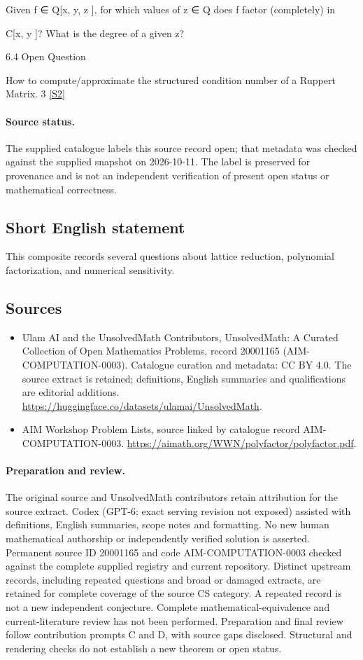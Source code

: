 \documentclass[11pt]{article}
\begin{document}
Given f ∈ Q[x, y, z ], for which values of z ∈ Q does f factor (completely) in

C[x, y ]? What is the degree of a given z?

6.4 Open Question

How to compute/approximate the structured condition number of a Ruppert Matrix. 3 \href{https://aimath.org/WWN/polyfactor/polyfactor.pdf}{[S2]}
\paragraph{Source status.}
The supplied catalogue labels this source record open; that metadata was checked against the supplied snapshot on 2026-10-11. The label is preserved for provenance and is not an independent verification of present open status or mathematical correctness.
\subsection{Short English statement}
This composite records several questions about lattice reduction, polynomial factorization, and numerical sensitivity.
\subsection{Sources}
\begin{itemize}
\item[S1] Ulam AI and the UnsolvedMath Contributors, UnsolvedMath: A Curated Collection of Open Mathematics Problems, record 20001165 (AIM-COMPUTATION-0003). Catalogue curation and metadata: CC BY 4.0. The source extract is retained; definitions, English summaries and qualifications are editorial additions.
\url{https://huggingface.co/datasets/ulamai/UnsolvedMath}.
\item[S2] AIM Workshop Problem Lists, source linked by catalogue record AIM-COMPUTATION-0003.
\url{https://aimath.org/WWN/polyfactor/polyfactor.pdf}.
\end{itemize}
\paragraph{Preparation and review.}
The original source and UnsolvedMath contributors retain attribution for the source extract. Codex (GPT-6; exact serving revision not exposed) assisted with definitions, English summaries, scope notes and formatting. No new human mathematical authorship or independently verified solution is asserted. Permanent source ID 20001165 and code AIM-COMPUTATION-0003 checked against the complete supplied registry and current repository. Distinct upstream records, including repeated questions and broad or damaged extracts, are retained for complete coverage of the source CS category. A repeated record is not a new independent conjecture. Complete mathematical-equivalence and current-literature review has not been performed. Preparation and final review follow contribution prompts C and D, with source gaps disclosed. Structural and rendering checks do not establish a new theorem or open status.
\label{end:20001165}
\end{document}
